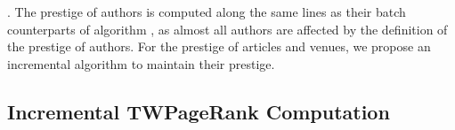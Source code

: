 .
The prestige of authors is computed along the same lines as their batch counterparts of algorithm \batensemble,
as almost all authors are affected  by the definition of the prestige of authors.
%
For the prestige of articles and venues, we propose an incremental algorithm to maintain their prestige.







\subsection{Incremental TWPageRank Computation}
\label{subsec-incTWPageRank-computation}




